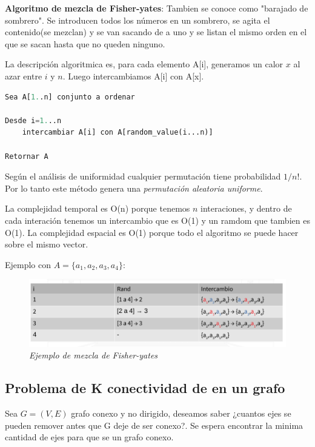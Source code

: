 \documentclass{article}
\begin{document}
\textbf{Algoritmo de mezcla de Fisher-yates}: Tambien se conoce como "barajado de sombrero".
Se introducen todos los números en un sombrero, se agita el contenido(se mezclan) y se van sacando
de a uno y se listan el mismo orden en el que se sacan hasta que no queden ninguno.

La descripción algoritmica es, para cada elemento A[i], generamos un calor \(x\) al azar entre \(i\) y \(n\). 
Luego intercambiamos A[i] con A[x].

\begin{lstlisting}[language=Python, caption=Algoritmo de Fisher-yates]
Sea A[1..n] conjunto a ordenar

Desde i=1...n
    intercambiar A[i] con A[random_value(i...n)]

Retornar A
\end{lstlisting}    

Según el análisis de uniformidad cualquier permutación tiene probabilidad \(1/n!\).
Por lo tanto este método genera una \textit{permutación aleatoria uniforme}.

La complejidad temporal es O(n) porque tenemos \(n\) interaciones, y dentro de cada interación
tenemos un intercambio que es O(1) y un ramdom que tambien es O(1). La complejidad espacial 
es O(1) porque todo el algoritmo se puede hacer sobre el mismo vector.

Ejemplo con \(A=\{a_1,a_2,a_3,a_4\}\):
\begin{figure}[h!]
    \begin{center} 
    \includegraphics[scale=0.3]{imagenes/ejemplo-mezcla-aleatoria.png}
    \caption{\small \sl Ejemplo de mezcla de Fisher-yates} 
    \end{center}
\end{figure}

\subsection{Problema de K conectividad de en un grafo}

Sea \(G=(V,E)\) grafo conexo y no dirigido, deseamos saber ¿cuantos ejes se pueden remover antes 
que G deje de ser conexo?. Se espera encontrar la minima cantidad de ejes para que se un grafo conexo.
\end{document}
